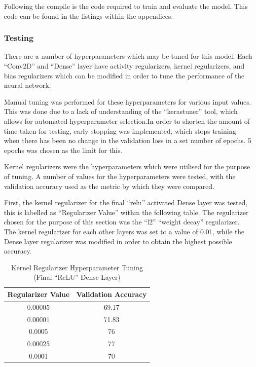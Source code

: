 Following the compile is the code required to train and evaluate the model. This
code can be found in the listings within the appendices.

\subsubsection{Testing}

There are a number of hyperparameters which may be tuned for this model. Each
``Conv2D'' and ``Dense'' layer have activity regularizers, kernel regularizers,
and bias regularizers which can be modified in order to tune the performance of
the neural network.

Manual tuning was performed for these hyperparameters for various input values.
This was done due to a lack of understanding of the ``kerastuner'' tool, which
allows for automated hyperparameter selection.In order to shorten the amount of
time taken for testing, early stopping was implemented, which stops training
when there has been no change in the validation loss in a set number of epochs.
5 epochs was chosen as the limit for this.

Kernel regularizers were the hyperparameters which were utilised for the purpose
of tuning. A number of values for the hyperparameters were tested, with the
validation accuracy used as the metric by which they were compared.

First, the kernel regularizer for the final ``relu'' activated Dense layer was
tested, this is labelled as ``Regularizer Value'' within the following table.
The regularizer chosen for the purpose of this section was the ``l2'' ``weight
decay'' regularizer.
The kernel regularizer for each other layers was set to a value of 0.01,
while the Dense layer regularizer was modified in order to obtain the highest
possible accuracy.

\begin{table}[H]
	\centering
	\caption{Kernel Regularizer Hyperparameter Tuning (Final ``ReLU'' Dense
	Layer)}
	\label{tab:krhyp}
	\begin{tabular}{|c|c|}
	\hline
	Regularizer Value & Validation Accuracy \\
	\hline
	0.00005 & 69.17 \\
	0.00001 & 71.83 \\
	0.0005  & 76 \\
	0.00025 & 77 \\
	0.0001  & 70 \\
	\hline
	\end{tabular}
\end{table}

